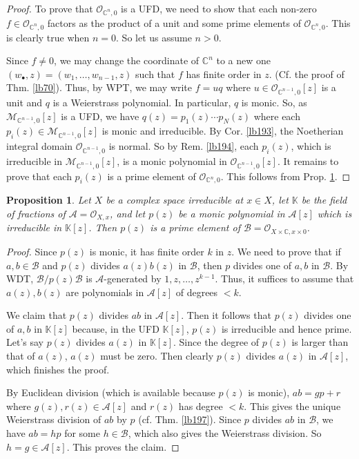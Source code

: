 \documentclass[12pt,b5paper,notitlepage]{report}
\theoremstyle{definition}
\theoremstyle{plain}
\newtheorem{pp}[df]{Proposition}
\newcommand{\scr}{\mathscr}
\newcommand{\blt}{\bullet}
\newcommand{\Kbb}{\mathbb K}
\newcommand{\Cbb}{\mathbb C}
\numberwithin{equation}{section}
\begin{document}
\begin{proof}
To prove that $\scr O_{\Cbb^n,0}$ is a UFD, we need to show that each non-zero $f\in\scr O_{\Cbb^n,0}$ factors as the product of a unit and some prime elements of $\scr O_{\Cbb^n,0}$. This is clearly true when $n=0$. So let us assume $n>0$.

Since $f\neq0$, we may change the coordinate of $\Cbb^n$ to a new one $(w_\blt,z)=(w_1,\dots,w_{n-1},z)$ such that $f$ has finite order in $z$. (Cf. the proof of Thm. \ref{lb70}). Thus, by WPT, we may write $f=uq$ where $u\in\scr O_{\Cbb^{n-1},0}[z]$ is a unit and $q$ is a Weierstrass polynomial. In particular, $q$ is monic. So, as $\scr M_{\Cbb^{n-1},0}[z]$ is a UFD, we have $q(z)=p_1(z)\cdots p_N(z)$ where each $p_i(z)\in\scr M_{\Cbb^{n-1},0}[z]$ is monic and irreducible. By Cor. \ref{lb193}, the Noetherian integral domain $\scr O_{\Cbb^{n-1},0}$ is normal. So by Rem. \ref{lb194}, each $p_i(z)$, which is irreducible in $\scr M_{\Cbb^{n-1},0}[z]$, is a monic polynomial in $\scr O_{\Cbb^{n-1},0}[z]$. It remains to prove that each $p_i(z)$ is a prime element of $\scr O_{\Cbb^n,0}$. This follows from Prop. \ref{lb196}.
\end{proof}




\begin{pp}\label{lb196}
Let $X$ be a complex space irreducible at $x\in X$, let $\Kbb$ be the field of fractions of $\scr A=\scr O_{X,x}$, and let $p(z)$ be a monic polynomial in $\scr A[z]$ which is irreducible in $\Kbb[z]$. Then $p(z)$ is a prime element of $\scr B=\scr O_{X\times\Cbb,x\times 0}$.
\end{pp}


\begin{proof}
Since $p(z)$ is monic, it has finite order $k$ in $z$. We need to prove that if $a,b\in\scr B$ and $p(z)$ divides $a(z)b(z)$ in $\scr B$, then $p$ divides one of $a,b$ in $\scr B$. By WDT, $\scr B/p(z)\scr B$ is $\scr A$-generated by $1,z,\dots,z^{k-1}$. Thus, it suffices to assume that $a(z),b(z)$ are polynomials in $\scr A[z]$ of degrees $<k$. 

We claim that $p(z)$ divides $ab$ in $\scr A[z]$. Then it follows that $p(z)$ divides one of $a,b$ in $\Kbb[z]$ because, in the UFD $\Kbb[z]$, $p(z)$ is irreducible and hence prime. Let's say $p(z)$ divides $a(z)$ in $\Kbb[z]$. Since the degree of $p(z)$ is larger than that of $a(z)$, $a(z)$ must be zero. Then clearly $p(z)$ divides $a(z)$ in $\scr A[z]$, which finishes the proof.

By Euclidean division (which is available because $p(z)$ is monic), $ab=gp+r$ where $g(z),r(z)\in\scr A[z]$ and $r(z)$ has degree $<k$. This gives the unique Weierstrass division of $ab$ by $p$ (cf. Thm. \ref{lb197}). Since $p$ divides $ab$ in $\scr B$, we have $ab=hp$ for some $h\in\scr B$, which also gives the Weierstrass division. So $h=g\in\scr A[z]$. This proves the claim.
\end{proof}
\end{document}
